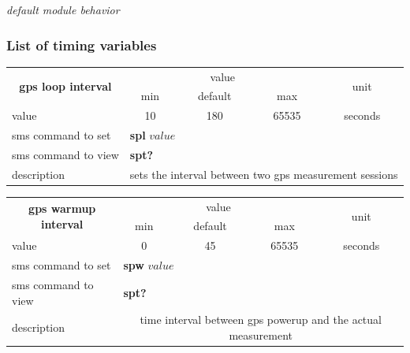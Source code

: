 \documentclass[a4paper,twoside]{refart}
\begin{document}
\begin{table}[ht]
\caption{\em default module behavior}
\label{gsm_diag}
\end{table}


\subsubsection{List of timing variables}

\label{sms:spl}
\begin{tabular}{ |l|c|c|c|c| }
    \hline
    \multicolumn{1}{|c|}{\multirow{2}{*}{\textbf{gps loop interval}}} & \multicolumn{3}{|c|}{value} & \multicolumn{1}{|c|}{\multirow{2}{*}{unit}} \\ \cline{2-4}
    \multicolumn{1}{|c|}{} & min & default & max & \\ \hline
    value & 10 & 180 & 65535 & seconds \\ \hline
    sms command to set & \multicolumn{4}{|l|}{\textbf{spl} $value$} \\ \hline
    sms command to view & \multicolumn{4}{|l|}{\textbf{spt?}} \\ \hline
    description & \multicolumn{4}{|p{7cm}|}{sets the interval between two gps measurement sessions} \\ \hline
\end{tabular}

\label{sms:spw}
\begin{tabular}{ |l|c|c|c|c| }
    \hline
    \multicolumn{1}{|c|}{\multirow{2}{*}{\textbf{gps warmup interval}}} & \multicolumn{3}{|c|}{value} & \multicolumn{1}{|c|}{\multirow{2}{*}{unit}} \\ \cline{2-4}
    \multicolumn{1}{|c|}{} & min & default & max & \\ \hline
    value & 0 & 45 & 65535 & seconds \\ \hline
    sms command to set & \multicolumn{4}{|l|}{\textbf{spw} $value$} \\ \hline
    sms command to view & \multicolumn{4}{|l|}{\textbf{spt?}} \\ \hline
    description & \multicolumn{4}{|p{7cm}|}{time interval between gps powerup and the actual measurement} \\ \hline
\end{tabular}
\end{document}
